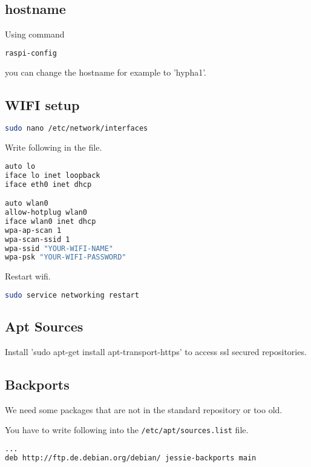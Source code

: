 \documentclass[a4paper,11pt]{report}
\begin{document}
\subsection{hostname}
Using command
\begin{lstlisting}[language=bash,caption={raspi-config}]
raspi-config
\end{lstlisting}
you can change the hostname for example to 'hypha1'.

\subsection{WIFI setup}

\begin{lstlisting}[language=bash,caption={interfaces}]
sudo nano /etc/network/interfaces
\end{lstlisting}
Write following in the file.

\begin{lstlisting}[language=bash,caption={/etc/network/interfaces}]
auto lo
iface lo inet loopback
iface eth0 inet dhcp

auto wlan0
allow-hotplug wlan0
iface wlan0 inet dhcp
wpa-ap-scan 1
wpa-scan-ssid 1
wpa-ssid "YOUR-WIFI-NAME"
wpa-psk "YOUR-WIFI-PASSWORD"
\end{lstlisting}

Restart wifi.
\begin{lstlisting}[language=bash,caption={restart interfaces}]
sudo service networking restart
\end{lstlisting}

\subsection{Apt Sources}
Install 'sudo apt-get install apt-transport-https'
to access ssl secured repositories.

\subsection{Backports}
We need some packages that are not in the standard repository or too old.

You have to write following into the \texttt{/etc/apt/sources.list} file.

\begin{lstlisting}[language=bash,caption={/etc/apt/sources.list}]
...
deb http://ftp.de.debian.org/debian/ jessie-backports main
\end{lstlisting}
\end{document}
